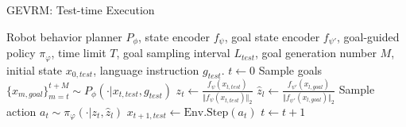 \begin{algorithm}
\caption{GEVRM: Test-time Execution}
\begin{algorithmic}[1]
\State Robot behavior planner $P_{\phi}$, state encoder $f_{\psi}$, goal state encoder $f_{\psi'}$, goal-guided policy $\pi_{\varphi}$, time limit $T$, goal sampling interval $L_{test}$, goal generation number $M$, initial state $x_{0,test}$, language instruction $g_{test}$.
\State  $t \leftarrow 0$
    \State Sample goals $\{x_{m,goal}\}_{m=t}^{t+M}\sim P_{\phi}(\cdot| x_{t,test}, g_{test})$ \textcolor{gray}{}
        \State $z_t \leftarrow \frac{f_{\psi}(x_{t,test})}{\Vert f_{\psi}(x_{t,test}) \Vert_2}$ \textcolor{gray}{}
        \State $\widehat{z}_l \leftarrow \frac{f_{\psi'}(x_{l,goal})}{\Vert f_{\psi'}(x_{l,goal}) \Vert_2}$ \textcolor{gray}{}
        \State Sample action $a_t \sim \pi_{\varphi}(\cdot|z_t,\widehat{z}_l)$ \textcolor{gray}{}
         \State$x_{t+1,test}  \leftarrow  \text{Env.Step}(a_t) $
        \State $t \leftarrow t+1$
        
    \EndFor
\EndWhile
\end{algorithmic}
\label{algo:test-time deployment}
\end{algorithm}


